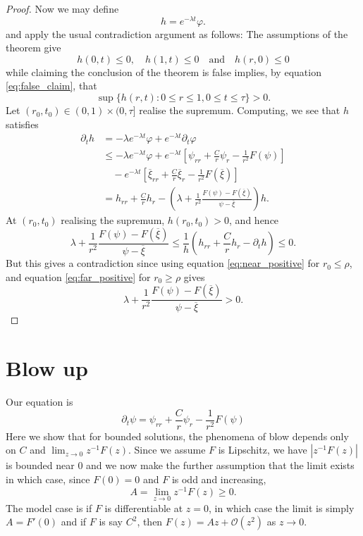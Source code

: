 \documentclass{amsart}
\begin{document}
\begin{proof}
Now we may define
\[
h = e^{-\lambda t} \varphi.
\]
and apply the usual contradiction argument as follows: The assumptions of the theorem give
\[
h(0, t) \leq 0, \quad h(1, t) \leq 0 \quad \text{and} \quad h(r, 0) \leq 0
\]
while claiming the conclusion of the theorem is false implies, by equation \eqref{eq:false_claim}, that
\[
\sup \{h(r, t) : 0 \leq r \leq 1, 0 \leq t \leq \tau\} > 0.
\]
Let \((r_0, t_0) \in (0, 1) \times (0, \tau]\) realise the supremum. Computing, we see that \(h\) satisfies
\[
\begin{split}
\partial_t h &= - \lambda e^{-\lambda t} \varphi + e^{-\lambda t} \partial_t \varphi \\
&\leq  -\lambda e^{-\lambda t} \varphi + e^{-\lambda t} \left[\psi_{rr} + \frac{C}{r} \psi_r - \frac{1}{r^2} F(\psi)\right] \\
&\quad - e^{-\lambda t}\left[\overline{\xi}_{rr} + \frac{C}{r} \overline{\xi}_r - \frac{1}{r^2} F(\overline{\xi})\right] \\
&= h_{rr} + \frac{C}{r} h_r - \left(\lambda + \frac{1}{r^2} \frac{F(\psi) - F(\overline{\xi})}{\psi - \overline{\xi}}\right) h.
\end{split}
\]
At \((r_0, t_0)\) realising the supremum, \(h(r_0, t_0) > 0\), and hence
\[
\lambda + \frac{1}{r^2} \frac{F(\psi) - F(\overline{\xi})}{\psi - \overline{\xi}} \leq \frac{1}{h} \left(h_{rr} + \frac{C}{r} h_r - \partial_t h\right) \leq 0.
\]
But this gives a contradiction since using equation \eqref{eq:near_positive} for \(r_0 \leq \rho\), and equation \eqref{eq:far_positive} for \(r_0 \geq \rho\) gives
\[
\lambda + \frac{1}{r^2} \frac{F(\psi) - F(\overline{\xi})}{\psi - \overline{\xi}} > 0.
\]
\end{proof}

\section{Blow up}

Our equation is
\[
\partial_t \psi = \psi_{rr} + \frac{C}{r} \psi_r - \frac{1}{r^2} F(\psi)
\]
Here we show that for bounded solutions, the phenomena of blow depends only on \(C\) and \(\lim_{z\to 0} z^{-1} F(z)\). Since we assume \(F\) is Lipschitz, we have \(|z^{-1} F(z)|\) is bounded near \(0\) and we now make the further assumption that the limit exists in which case, since \(F(0) = 0\) and \(F\) is odd and increasing,
\[
A = \lim_{z\to 0} z^{-1} F(z) \geq 0.
\]
The model case is if \(F\) is differentiable at \(z=0\), in which case the limit is simply \(A = F'(0)\) and if \(F\) is say \(C^2\), then \(F(z) = Az + \mathcal{O} (z^2)\) as \(z \to 0\).
\end{document}
